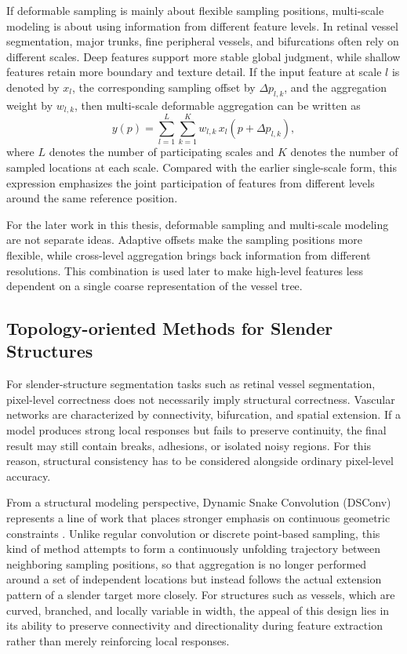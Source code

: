 \documentclass[a4paper,11pt]{article}
\begin{document}
If deformable sampling is mainly about flexible sampling positions, multi-scale modeling is about using information from different feature levels. In retinal vessel segmentation, major trunks, fine peripheral vessels, and bifurcations often rely on different scales. Deep features support more stable global judgment, while shallow features retain more boundary and texture detail. If the input feature at scale \(l\) is denoted by \(x_l\), the corresponding sampling offset by \(\Delta p_{l,k}\), and the aggregation weight by \(w_{l,k}\), then multi-scale deformable aggregation can be written as
\begin{equation}
y(p)=\sum_{l=1}^{L}\sum_{k=1}^{K} w_{l,k}\,x_l(p+\Delta p_{l,k}),
\end{equation}
where \(L\) denotes the number of participating scales and \(K\) denotes the number of sampled locations at each scale. Compared with the earlier single-scale form, this expression emphasizes the joint participation of features from different levels around the same reference position.

For the later work in this thesis, deformable sampling and multi-scale modeling are not separate ideas. Adaptive offsets make the sampling positions more flexible, while cross-level aggregation brings back information from different resolutions. This combination is used later to make high-level features less dependent on a single coarse representation of the vessel tree.

\subsection{Topology-oriented Methods for Slender Structures}
For slender-structure segmentation tasks such as retinal vessel segmentation, pixel-level correctness does not necessarily imply structural correctness. Vascular networks are characterized by connectivity, bifurcation, and spatial extension. If a model produces strong local responses but fails to preserve continuity, the final result may still contain breaks, adhesions, or isolated noisy regions. For this reason, structural consistency has to be considered alongside ordinary pixel-level accuracy.

From a structural modeling perspective, Dynamic Snake Convolution (DSConv) represents a line of work that places stronger emphasis on continuous geometric constraints \cite{qi2023dsc}. Unlike regular convolution or discrete point-based sampling, this kind of method attempts to form a continuously unfolding trajectory between neighboring sampling positions, so that aggregation is no longer performed around a set of independent locations but instead follows the actual extension pattern of a slender target more closely. For structures such as vessels, which are curved, branched, and locally variable in width, the appeal of this design lies in its ability to preserve connectivity and directionality during feature extraction rather than merely reinforcing local responses.
\end{document}

